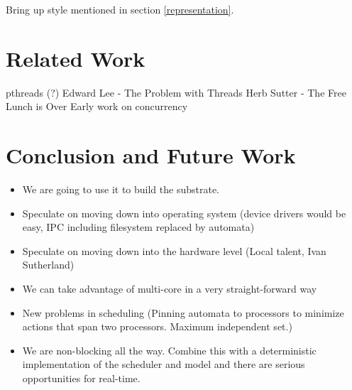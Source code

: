 \documentclass[letterpaper]{article}
\begin{document}
Bring up style mentioned in section \ref{representation}.

\section{Related Work\label{related_work}}

pthreads (?)
Edward Lee - The Problem with Threads
Herb Sutter - The Free Lunch is Over
Early work on concurrency

\section{Conclusion and Future Work\label{conclusion}}

\begin{itemize}
  \item We are going to use it to build the substrate.
  \item Speculate on moving down into operating system (device drivers would be easy, IPC including filesystem replaced by automata)
  \item Speculate on moving down into the hardware level (Local talent, Ivan Sutherland)
  \item We can take advantage of multi-core in a very straight-forward way
  \item New problems in scheduling (Pinning automata to processors to minimize actions that span two processors.  Maximum independent set.)
  \item We are non-blocking all the way.  Combine this with a deterministic implementation of the scheduler and model and there are serious opportunities for real-time.
\end{itemize}
\end{document}
